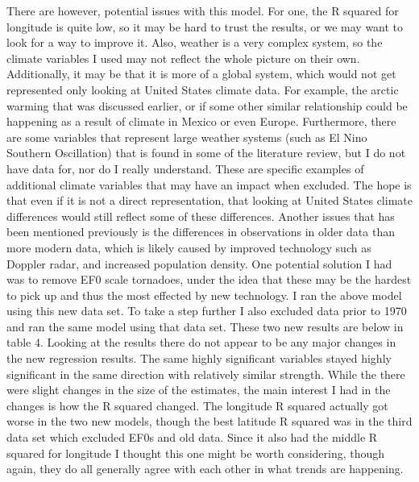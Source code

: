 \documentclass[12pt,english]{article}
\begin{document}
There are however, potential issues with this model. For one, the R squared for longitude is quite low, so it may be hard to trust the results, or we may want to look for a way to improve it. Also, weather is a very complex system, so the climate variables I used may not reflect the whole picture on their own. Additionally, it may be that it is more of a global system, which would not get represented only looking at United States climate data. For example, the arctic warming that was discussed earlier, or if some other similar relationship could be happening as a result of climate in Mexico or even Europe. Furthermore, there are some variables that represent large weather systems (such as El Nino Southern Oscillation) that is found in some of the literature review, but I do not have data for, nor do I really understand. These are specific examples of additional climate variables that may have an impact when excluded. The hope is that even if it is not a direct representation, that looking at United States climate differences would still reflect some of these differences. Another issues that has been mentioned previously is the differences in observations in older data than more modern data, which is likely caused by improved technology such as Doppler radar, and increased population density. One potential solution I had was to remove EF0 scale tornadoes, under the idea that these may be the hardest to pick up and thus the most effected by new technology. I ran the above model using this new data set. To take a step further I also excluded data prior to 1970 and ran the same model using that data set. These two new results are below in table 4. Looking at the results there do not appear to be any major changes in the new regression results. The same highly significant variables stayed highly significant in the same direction with relatively similar strength. While the there were slight changes in the size of the estimates, the main interest I had in the changes is how the R squared changed. The longitude R squared actually got worse in the two new models, though the best latitude R squared was in the third data set which excluded EF0s and old data. Since it also had the middle R squared for longitude I thought this one might be worth considering, though again, they do all generally agree with each other in what trends are happening. 
\end{document}
